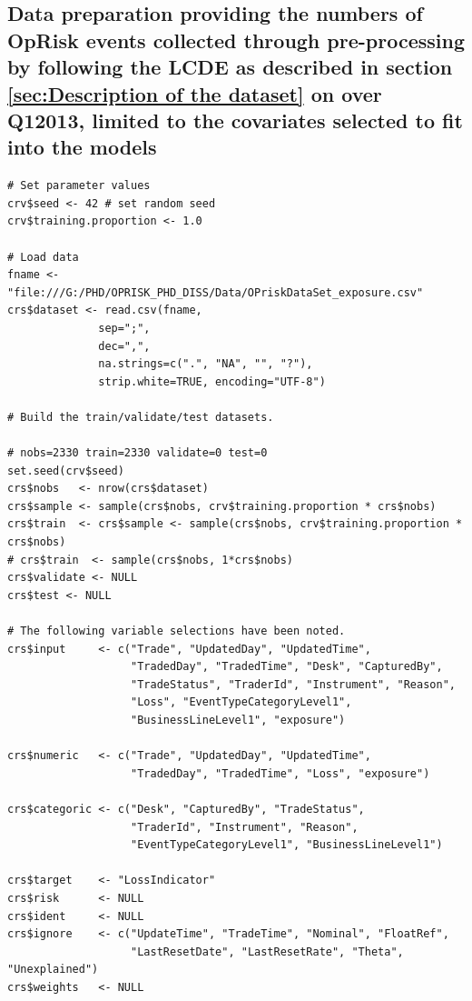 \documentclass{DissertateUSU}
\begin{document}
\normalsize

\subsection{Data preparation providing the numbers of OpRisk events collected through pre-processing by following the LCDE as described in section \ref{sec:Description of the dataset} on \pageref{sec:Description of the dataset} over Q12013, limited to the covariates selected to fit into the models}
\label{ssec:Data preparation pre-processed}

\small

\begin{verbatim}
# Set parameter values
crv$seed <- 42 # set random seed
crv$training.proportion <- 1.0

# Load data
fname <- "file:///G:/PHD/OPRISK_PHD_DISS/Data/OPriskDataSet_exposure.csv"
crs$dataset <- read.csv(fname,
              sep=";",
              dec=",",
              na.strings=c(".", "NA", "", "?"),
              strip.white=TRUE, encoding="UTF-8")

# Build the train/validate/test datasets.

# nobs=2330 train=2330 validate=0 test=0
set.seed(crv$seed)
crs$nobs   <- nrow(crs$dataset)
crs$sample <- sample(crs$nobs, crv$training.proportion * crs$nobs)
crs$train  <- crs$sample <- sample(crs$nobs, crv$training.proportion * crs$nobs)
# crs$train  <- sample(crs$nobs, 1*crs$nobs)
crs$validate <- NULL
crs$test <- NULL

# The following variable selections have been noted.
crs$input     <- c("Trade", "UpdatedDay", "UpdatedTime",
                   "TradedDay", "TradedTime", "Desk", "CapturedBy",
                   "TradeStatus", "TraderId", "Instrument", "Reason",
                   "Loss", "EventTypeCategoryLevel1",
                   "BusinessLineLevel1", "exposure")

crs$numeric   <- c("Trade", "UpdatedDay", "UpdatedTime",
                   "TradedDay", "TradedTime", "Loss", "exposure")

crs$categoric <- c("Desk", "CapturedBy", "TradeStatus",
                   "TraderId", "Instrument", "Reason",
                   "EventTypeCategoryLevel1", "BusinessLineLevel1")

crs$target    <- "LossIndicator"
crs$risk      <- NULL
crs$ident     <- NULL
crs$ignore    <- c("UpdateTime", "TradeTime", "Nominal", "FloatRef", 
                   "LastResetDate", "LastResetRate", "Theta", "Unexplained")
crs$weights   <- NULL
\end{verbatim}
\end{document}
